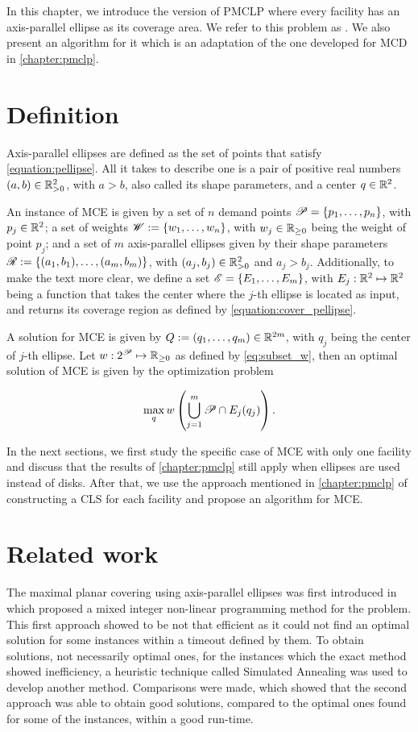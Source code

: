 In this chapter, we introduce the version of PMCLP where every 
facility has an axis-parallel ellipse as its coverage area. We refer to this problem as . We also present an algorithm for it which is an adaptation of the one developed for MCD in \autoref{chapter:pmclp}.

\section{Definition}

Axis-parallel ellipses are defined as the set of points that satisfy \autoref{equation:pellipse}. All it takes to describe one is a pair of positive real numbers $(a,b) \in \mathbb{R}_{>0}^2$, with $a>b$, also called its shape parameters, and a center $q \in \mathbb{R}^2$.

An instance of MCE is given by a set of $n$ demand points $\mathscr{P} = \{p_1, \dots, p_n\}$, with $p_j\in\mathbb{R}^2$; 
a set of weights $\mathscr{W}:=\{w_1, \dots, w_n\}$, with $w_j\in\mathbb{R}_{\ge0}$ being the weight of point $p_j$;
and a set of $m$ axis-parallel ellipses given by their shape parameters $\mathscr{R}:=\{(a_1, b_1), \dots, (a_m, b_m)\}$, with $(a_j, b_j)\in\mathbb{R}_{>0}^2$ and $a_j>b_j$.
Additionally, to make the text more clear, we define a set $\mathscr{E} = \{E_1, \dots, E_m\}$, with $E_j : \mathbb{R}^2 \mapsto \mathbb{R}^2$ being a function that takes the center where the $j$-th ellipse is located as input, and returns its coverage region as defined by \autoref{equation:cover_pellipse}.

A solution for MCE is given by $Q:=(q_1, \dots, q_m)\in\mathbb{R}^{2m}$, with $q_j$ being the center of $j$-th ellipse. Let $w : 2^{\mathscr{P}} \mapsto \mathbb{R}_{\ge0}$ as defined by \autoref{eq:subset_w}, then an optimal solution of MCE is given by the optimization problem

\begin{equation*}
\max_q w\left(\bigcup_{j=1}^m \mathscr{P} \cap E_j(q_j)\right).
\end{equation*}

In the next sections, we first study the specific case of MCE with only one facility and discuss that the results of \autoref{chapter:pmclp} still apply when ellipses are used instead of disks. After that, we use the approach mentioned in \autoref{chapter:pmclp} of constructing a CLS for each facility and propose an algorithm for MCE.

\section{Related work}
The maximal planar covering using axis-parallel ellipses was first introduced in  which proposed a mixed integer non-linear programming method for the problem. This first approach showed to be not that efficient as it could not find an optimal solution for some instances within a timeout defined by them. To obtain solutions, not necessarily optimal ones, for the instances which the exact method showed inefficiency, a heuristic technique called Simulated Annealing was used to develop another method. Comparisons were made, which showed that the second approach was able to obtain good solutions, compared to the optimal ones found for some of the instances, within a good run-time.

